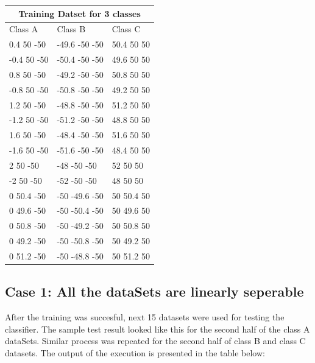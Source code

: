 \documentclass[letterpaper]{article}
\begin{document}
  \begin{tabular}{ |p{5cm}|p{3cm}|p{3cm}| }
 \hline
 \multicolumn{3}{|c|}{Training Datset for 3 classes} \\
 \hline
Class A& Class B & Class C\\
 \hline
0.4 50 -50 & -49.6 -50 -50 & 50.4 50 50 \\
-0.4 50 -50 & -50.4 -50 -50 & 49.6 50 50 \\
0.8 50 -50 & -49.2 -50 -50 & 50.8 50 50 \\
-0.8 50 -50 & -50.8 -50 -50 & 49.2 50 50 \\
1.2 50 -50 & -48.8 -50 -50 & 51.2 50 50 \\
-1.2 50 -50 & -51.2 -50 -50 & 48.8 50 50 \\
1.6 50 -50 & -48.4 -50 -50 & 51.6 50 50 \\
-1.6 50 -50 & -51.6 -50 -50 & 48.4 50 50 \\
2 50 -50 & -48 -50 -50 & 52 50 50 \\
-2 50 -50 & -52 -50 -50 & 48 50 50 \\
0 50.4 -50 & -50 -49.6 -50 & 50 50.4 50 \\
0 49.6 -50 & -50 -50.4 -50 & 50 49.6 50 \\
0 50.8 -50 & -50 -49.2 -50 & 50 50.8 50 \\
0 49.2 -50 & -50 -50.8 -50 & 50 49.2 50 \\
0 51.2 -50 & -50 -48.8 -50 & 50 51.2 50 \\

 \hline

\end {tabular}

  \subsection {Case 1: All the dataSets are linearly seperable}
  After the training was succesful, next 15 datasets were used for testing the classifier. The sample test result looked like this for the second half of the class A dataSets. Similar process was repeated for the second half of class B and class C datasets. The output of the execution is presented in the table below: 
\end{document}
